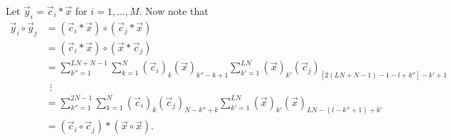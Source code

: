 \documentclass[a4paper, openany, oneside]{memoir}
\begin{document}
Let $\vec{y}_i = \vec{c}_i \ast \vec{x}$ for $i = 1,\ldots,M$. Now note that
\begin{align*}
    \vec{y}_i \circ \vec{y}_j &= (\vec{c}_i \ast \vec{x}) \circ (\vec{c}_j \ast \vec{x}) \\
    &= (\vec{c}_i \ast \vec{x}) \circ (\vec{x} \ast \vec{c}_j) \\
    &=\sum_{k''=1}^{LN+N-1}\sum_{k=1}^N (\vec{c}_i)_k (\vec{x})_{k''-k+1}\sum_{k'=1}^{LN}(\vec{x})_{k'}(\vec{c}_j)_{[2(LN+N-1)-1-l+k'']-k'+1} \\
    &~~\vdots \\
    &=\sum_{k''=1}^{2N-1} \sum_{k=1}^{N} (\vec{c}_i)_k (\vec{c}_j)_{N-k''+k} \sum_{k'=1}^{LN} (\vec{x})_{k'} (\vec{x})_{LN-(l-k''+1)+k'} \\
    &=(\vec{c}_i \circ \vec{c}_j) \ast (\vec{x} \circ \vec{x}).
\end{align*}
\end{document}
